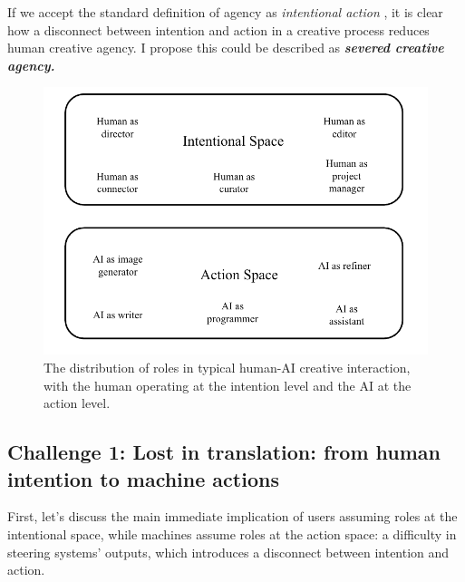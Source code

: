 If we accept the standard definition of agency as \textit{intentional action} \cite{Schlosser2019-jk}, it is clear how a disconnect between intention and action in a creative process reduces human creative agency. I propose this could be described as \textbf{\textit{severed creative agency.}}

\begin{figure}[H]
    \centering
    \includegraphics[width=0.75\linewidth]{roles.png}
    \caption{The distribution of roles in typical human-AI creative interaction, with the human operating at the intention level and the AI at the action level.}
    \label{fig:roles-in-spaces}
\end{figure}


\subsection{Challenge 1: Lost in translation: from human intention to machine actions}

First, let's discuss the main immediate implication of users assuming roles at the intentional space, while machines assume roles at the action space: a difficulty in steering systems' outputs, which introduces a disconnect between intention and action.

